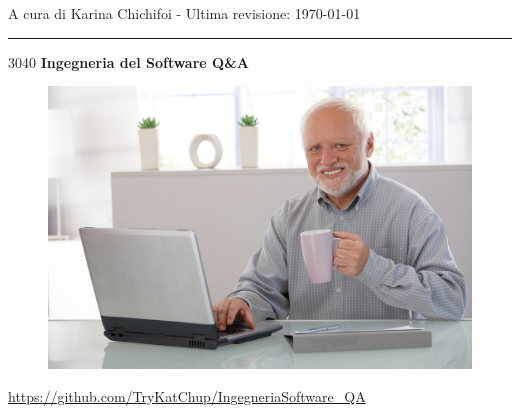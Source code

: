 \documentclass{article}
\makeatletter
\newcommand\HUGE{\@setfontsize\Huge{30}{40}}
\makeatother
\begin{document}
\begin{titlepage}
	\centering
	\large
	A cura di Karina Chichifoi - Ultima revisione: \today

	\noindent\rule{15cm}{0.2pt}

	\vspace{1.5cm}

	\HUGE
	\textbf{Ingegneria del Software Q\&A}

	\vspace{2cm}
	\begin{figure}[htb!]
		\centering
		\includegraphics[width=13.5cm]{./immagini/HideThePainHarold.jpg}
	\end{figure}
	\normalsize
	\url{https://github.com/TryKatChup/IngegneriaSoftware_QA}

	\clearpage
\end{titlepage}
\renewcommand{\abstractname}{}
\end{document}
